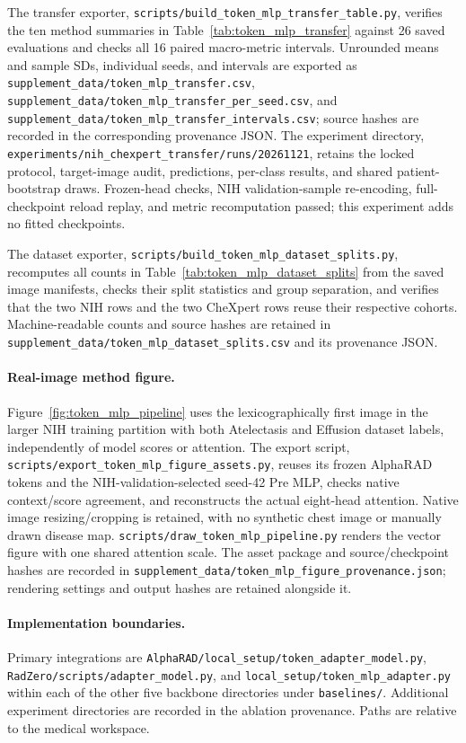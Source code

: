 \documentclass[10pt,twocolumn,letterpaper]{article}
\begin{document}
The transfer exporter, \nolinkurl{scripts/build_token_mlp_transfer_table.py}, verifies the ten method summaries in Table~\ref{tab:token_mlp_transfer} against 26 saved evaluations and checks all 16 paired macro-metric intervals. Unrounded means and sample SDs, individual seeds, and intervals are exported as \nolinkurl{supplement_data/token_mlp_transfer.csv}, \nolinkurl{supplement_data/token_mlp_transfer_per_seed.csv}, and \nolinkurl{supplement_data/token_mlp_transfer_intervals.csv}; source hashes are recorded in the corresponding provenance JSON. The experiment directory, \nolinkurl{experiments/nih_chexpert_transfer/runs/20261121}, retains the locked protocol, target-image audit, predictions, per-class results, and shared patient-bootstrap draws. Frozen-head checks, NIH validation-sample re-encoding, full-checkpoint reload replay, and metric recomputation passed; this experiment adds no fitted checkpoints.

The dataset exporter, \nolinkurl{scripts/build_token_mlp_dataset_splits.py}, recomputes all counts in Table~\ref{tab:token_mlp_dataset_splits} from the saved image manifests, checks their split statistics and group separation, and verifies that the two NIH rows and the two CheXpert rows reuse their respective cohorts. Machine-readable counts and source hashes are retained in \nolinkurl{supplement_data/token_mlp_dataset_splits.csv} and its provenance JSON.

\paragraph{Real-image method figure.}
Figure~\ref{fig:token_mlp_pipeline} uses the lexicographically first image in the larger NIH training partition with both Atelectasis and Effusion dataset labels, independently of model scores or attention. The export script, \nolinkurl{scripts/export_token_mlp_figure_assets.py}, reuses its frozen AlphaRAD tokens and the NIH-validation-selected seed-42 Pre MLP, checks native context/score agreement, and reconstructs the actual eight-head attention. Native image resizing/cropping is retained, with no synthetic chest image or manually drawn disease map. \nolinkurl{scripts/draw_token_mlp_pipeline.py} renders the vector figure with one shared attention scale. The asset package and source/checkpoint hashes are recorded in \nolinkurl{supplement_data/token_mlp_figure_provenance.json}; rendering settings and output hashes are retained alongside it.

\paragraph{Implementation boundaries.}
Primary integrations are \nolinkurl{AlphaRAD/local_setup/token_adapter_model.py}, \nolinkurl{RadZero/scripts/adapter_model.py}, and \nolinkurl{local_setup/token_mlp_adapter.py} within each of the other five backbone directories under \nolinkurl{baselines/}. Additional experiment directories are recorded in the ablation provenance. Paths are relative to the medical workspace.




\end{document}
